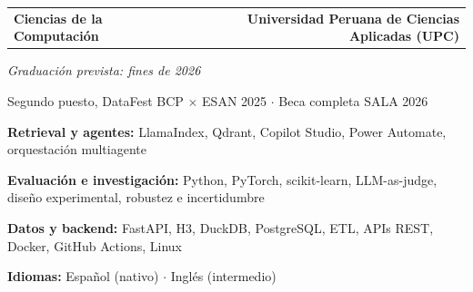 \documentclass[10pt,a4paper]{article}
\begin{document}
\begin{tabular*}{\textwidth}{@{\extracolsep{\fill}}lr}
  \textbf{Ciencias de la Computación} & \textbf{Universidad Peruana de Ciencias Aplicadas (UPC)}
\end{tabular*}\par
\textit{Graduación prevista: fines de 2026}\par
Segundo puesto, DataFest BCP $\times$ ESAN 2025 $\cdot$ Beca completa SALA 2026

\textbf{Retrieval y agentes:} LlamaIndex, Qdrant, Copilot Studio, Power Automate, orquestación multiagente\par
\textbf{Evaluación e investigación:} Python, PyTorch, scikit-learn, LLM-as-judge, diseño experimental, robustez e incertidumbre\par
\textbf{Datos y backend:} FastAPI, H3, DuckDB, PostgreSQL, ETL, APIs REST, Docker, GitHub Actions, Linux\par
\textbf{Idiomas:} Español (nativo) $\cdot$ Inglés (intermedio)
\end{document}
